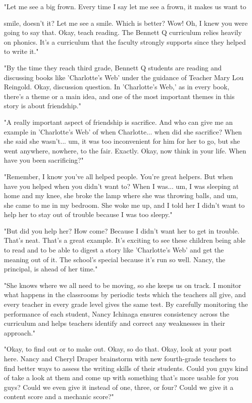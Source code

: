 "Let me see a big frown. Every time I say let me see a frown, it makes us want to

smile, doesn't it? Let me see a smile. Which is better? Wow! Oh, I knew you were going to say that. Okay, teach reading. The Bennett Q curriculum relies heavily on phonics. It's a curriculum that the faculty strongly supports since they helped to write it."

"By the time they reach third grade, Bennett Q students are reading and discussing books like 'Charlotte's Web' under the guidance of Teacher Mary Lou Reingold. Okay, discussion question. In 'Charlotte's Web,' as in every book, there's a theme or a main idea, and one of the most important themes in this story is about friendship."

"A really important aspect of friendship is sacrifice. And who can give me an example in 'Charlotte's Web' of when Charlotte... when did she sacrifice? When she said she wasn't... um, it was too inconvenient for him for her to go, but she went anywhere, nowhere, to the fair. Exactly. Okay, now think in your life. When have you been sacrificing?"

"Remember, I know you've all helped people. You're great helpers. But when have you helped when you didn't want to? When I was... um, I was sleeping at home and my knee, she broke the lamp where she was throwing balls, and um, she came to me in my bedroom. She woke me up, and I told her I didn't want to help her to stay out of trouble because I was too sleepy."

"But did you help her? How come? Because I didn't want her to get in trouble. That's neat. That's a great example. It's exciting to see these children being able to read and to be able to digest a story like 'Charlotte's Web' and get the meaning out of it. The school's special because it's run so well. Nancy, the principal, is ahead of her time."

"She knows where we all need to be moving, so she keeps us on track. I monitor what happens in the classrooms by periodic tests which the teachers all give, and every teacher in every grade level gives the same test. By carefully monitoring the performance of each student, Nancy Ichinaga ensures consistency across the curriculum and helps teachers identify and correct any weaknesses in their approach."

"Okay, to find out or to make out. Okay, so do that. Okay, look at your post here. Nancy and Cheryl Draper brainstorm with new fourth-grade teachers to find better ways to assess the writing skills of their students. Could you guys kind of take a look at them and come up with something that's more usable for you guys? Could we even give it instead of one, three, or four? Could we give it a content score and a mechanic score?"

